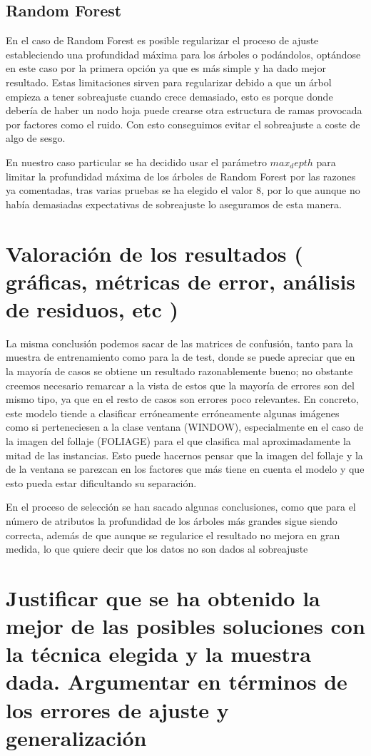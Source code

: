 \documentclass{article}
\begin{document}
	\subsection{Random Forest}
	En el caso de Random Forest es posible regularizar el proceso de ajuste estableciendo una profundidad máxima para los árboles o podándolos, optándose en este caso por la primera opción ya que es más simple y ha dado mejor resultado. Estas limitaciones sirven para regularizar debido a que un árbol empieza a tener sobreajuste cuando crece demasiado, esto es porque donde debería de haber un nodo hoja puede crearse otra estructura de ramas provocada por factores como el ruido. Con esto conseguimos evitar el sobreajuste a coste de algo de sesgo.
	\par
	En nuestro caso particular se ha decidido usar el parámetro $max_depth$ para limitar la profundidad máxima de los árboles de Random Forest por las razones ya comentadas, tras varias pruebas se ha elegido el valor 8, por lo que aunque no había demasiadas expectativas de sobreajuste lo aseguramos de esta manera.
	
	\section{Valoración de los resultados ( gráficas, métricas de error, análisis de residuos, etc )} %
	La misma conclusión podemos sacar de las matrices de confusión, tanto para la muestra de entrenamiento como para la de test, donde se puede apreciar que en la mayoría de casos se obtiene un resultado razonablemente bueno; no obstante creemos necesario remarcar a la vista de estos que la mayoría de errores son del mismo tipo, ya que en el resto de casos son errores poco relevantes. En concreto, este modelo tiende a clasificar erróneamente erróneamente algunas imágenes como si perteneciesen a la clase ventana (WINDOW), especialmente en el caso de la imagen del follaje (FOLIAGE) para el que clasifica mal aproximadamente la mitad de las instancias. Esto puede hacernos pensar que la imagen del follaje y la de la ventana se parezcan en los factores que más tiene en cuenta el modelo y que esto pueda estar dificultando su separación. %
	\par 
	En el proceso de selección se han sacado algunas conclusiones, como que para el número de atributos la profundidad de los árboles más grandes sigue siendo correcta, además de que aunque se regularice el resultado no mejora en gran medida, lo que quiere decir que los datos no son dados al sobreajuste %
	
	\section{Justificar que se ha obtenido la mejor de las posibles soluciones con la técnica elegida y la muestra dada. Argumentar en términos de los errores de ajuste y generalización} %
	
	
	
\end{document}
